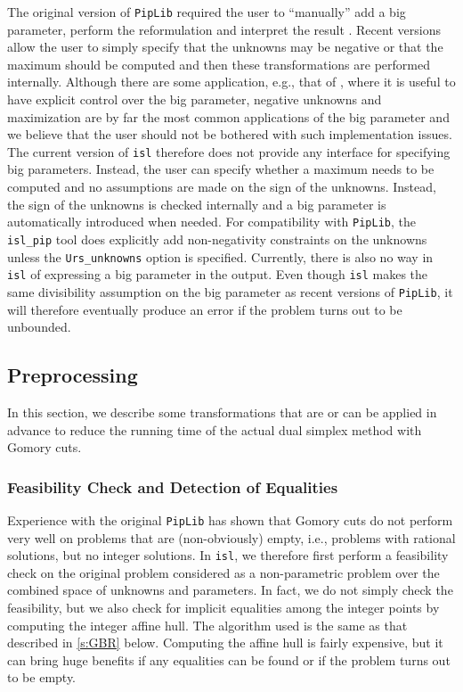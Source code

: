 The original version of {\tt PipLib} required the user to ``manually''
add a big parameter, perform the reformulation and interpret the result
.  Recent versions allow the user to simply
specify that the unknowns may be negative or that the maximum should
be computed and then these transformations are performed internally.
Although there are some application, e.g.,
that of ,
where it is useful to have explicit control over the big parameter,
negative unknowns and maximization are by far the most common applications
of the big parameter and we believe that the user should not be bothered
with such implementation issues.
The current version of {\tt isl} therefore does not
provide any interface for specifying big parameters.  Instead, the user
can specify whether a maximum needs to be computed and no assumptions
are made on the sign of the unknowns.  Instead, the sign of the unknowns
is checked internally and a big parameter is automatically introduced when
needed.  For compatibility with {\tt PipLib}, the {\tt isl\_pip} tool
does explicitly add non-negativity constraints on the unknowns unless
the \verb+Urs_unknowns+ option is specified.
Currently, there is also no way in {\tt isl} of expressing a big
parameter in the output.  Even though
{\tt isl} makes the same divisibility assumption on the big parameter
as recent versions of {\tt PipLib}, it will therefore eventually
produce an error if the problem turns out to be unbounded.

\subsection{Preprocessing}

In this section, we describe some transformations that are
or can be applied in advance to reduce the running time
of the actual dual simplex method with Gomory cuts.

\subsubsection{Feasibility Check and Detection of Equalities}

Experience with the original {\tt PipLib} has shown that Gomory cuts
do not perform very well on problems that are (non-obviously) empty,
i.e., problems with rational solutions, but no integer solutions.
In {\tt isl}, we therefore first perform a feasibility check on
the original problem considered as a non-parametric problem
over the combined space of unknowns and parameters.
In fact, we do not simply check the feasibility, but we also
check for implicit equalities among the integer points by computing
the integer affine hull.  The algorithm used is the same as that
described in \autoref{s:GBR} below.
Computing the affine hull is fairly expensive, but it can
bring huge benefits if any equalities can be found or if the problem
turns out to be empty.

